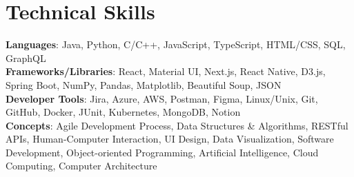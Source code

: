 \documentclass[letterpaper,10pt]{article}
\begin{document}
%
\section{Technical Skills}
\begin{itemize}[leftmargin=0.15in, label={}]
    \small{\item{
        \textbf{Languages}{: Java, Python, C/C++, JavaScript, TypeScript, HTML/CSS, SQL, GraphQL} \\
        \textbf{Frameworks/Libraries}{: React, Material UI, Next.js, React Native, D3.js, Spring Boot, NumPy, Pandas, Matplotlib, Beautiful Soup, JSON} \\
        \textbf{Developer Tools}{: Jira, Azure, AWS, Postman, Figma, Linux/Unix, Git, GitHub, Docker, JUnit, Kubernetes, MongoDB, Notion} \\
        \textbf{Concepts}{: Agile Development Process, Data Structures \& Algorithms, RESTful APIs, Human-Computer Interaction, UI Design, Data Visualization, Software Development, Object-oriented Programming, Artificial Intelligence, Cloud Computing, Computer Architecture} \\
        }}
\end{itemize}



\end{document}
